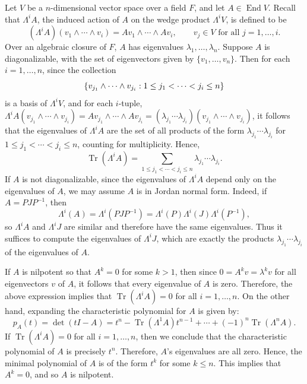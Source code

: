 \documentclass{article}
\begin{document}
\begin{solutions}
	Let $V$ be a $n$-dimensional vector space over a field $F$, and let $A \in \operatorname{End}{V}$. Recall that $\Lambda^{i}A$, the induced action of $A$ on the wedge product $\Lambda^{i}V$, is defined to be 
		\begin{equation}
			(\Lambda^{i}A)(v_{1} \wedge \dotsm \wedge v_{i}) = Av_{1} \wedge \dotsm \wedge Av_{i}, \qquad v_{j} \in V \text{ for all } j =1, \ldots, i. 
		\end{equation}
	Over an algebraic closure of $F$, $A$ has eigenvalues $\lambda_{1}, \ldots, \lambda_{n}$. Suppose $A$ is diagonalizable, with the set of eigenvectors given by $\{v_{1}, \ldots, v_{n}\}$. Then for each $i = 1, \ldots, n$, since the collection 
		\begin{equation*}
			\brac*{v_{j_{1}} \wedge \dotsm\wedge v_{j_{i}}: 1 \leq j_{1} < \dotsm < j_{i} \leq n}
		\end{equation*}
	is a basis of $\Lambda^{i}V$, and for each $i$-tuple, $\Lambda^{i}A(v_{j_{1}} \wedge \dotsm \wedge v_{j_{i}}) = Av_{j_{1}} \wedge \dotsm \wedge Av_{j_{i}} = (\lambda_{j_{1}}\dotsm\lambda_{j_{i}})(v_{j_{1}} \wedge \dotsm \wedge v_{j_{i}})$, it follows that the eigenvalues of $\Lambda^{i}A$ are the set of all products of the form $\lambda_{j_{1}} \dotsm \lambda_{j_{i}}$ for $1 \leq j_{1} < \dotsm < j_{i} \leq n$, counting for multiplicity. Hence,
		\begin{equation}
			\operatorname{Tr}(\Lambda^{i}A) = \sum_{1 \leq j_{1} < \dotsm < j_{i} \leq n}\lambda_{j_{1}}\dotsm\lambda_{j_{i}}. 
		\end{equation}
	If $A$ is not diagonalizable, since the eigenvalues of $\Lambda^{i}A$ depend only on the eigenvalues of $A$, we may assume $A$ is in Jordan normal form. Indeed, if $A = PJP^{-1}$, then 
		\begin{equation}
			\Lambda^{i}(A) = \Lambda^{i}(PJP^{-1}) = \Lambda^{i}(P)\Lambda^{i}(J)\Lambda^{i}(P^{-1}), 
		\end{equation}
	so $\Lambda^{i}A$ and $\Lambda^{i}J$ are similar and therefore have the same eigenvalues. Thus it suffices to compute the eigenvalues of $\Lambda^{i}J$, which are exactly the products $\lambda_{j_{1}}\dotsm\lambda_{j_{i}}$ of the eigenvalues of $A$. 
	
	If $A$ is nilpotent so that $A^{k} = 0$ for some $k > 1$, then since $0 = A^{k}v = \lambda^{k}v$ for all eigenvectors $v$ of $A$, it follows that every eigenvalue of $A$ is zero. Therefore, the above expression implies that $\operatorname{Tr}(\Lambda^{i}A) = 0$ for all $i = 1, \ldots, n$. On the other hand, expanding the characteristic polynomial for $A$ is given by:
		\begin{equation}
			p_{A}(t) = \det(tI - A) = t^{n} - \operatorname{Tr}(\Lambda^{1}A)t^{n - 1} + \dotsm + (-1)^{n}\operatorname{Tr}(\Lambda^{n}A). 
		\end{equation}
	If $\operatorname{Tr}(\Lambda^{i}A)=0$ for all $i = 1, \ldots, n$, then we conclude that the characteristic polynomial of $A$ is precisely $t^{n}$. Therefore, $A$'s eigenvalues are all zero. Hence, the minimal polynomial of $A$ is of the form $t^{k}$ for some $k \leq n$. This implies that $A^{k} = 0$, and so $A$ is nilpotent. 
\end{solutions}
\end{document}
